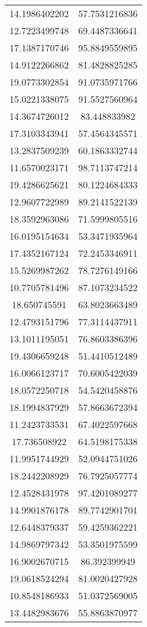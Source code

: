 \begin{table}
\begin{tabular}{cc}
14.1986402202 & 57.7531216836 \\
12.7223499748 & 69.4487336641 \\
17.1387170746 & 95.8849559895 \\
14.9122266862 & 81.4828825285 \\
19.0773302854 & 91.0735971766 \\
15.0221338075 & 91.5527560964 \\
14.3674726012 & 83.448833982 \\
17.3103343941 & 57.4564345571 \\
13.2837509239 & 60.1863332744 \\
11.6570023171 & 98.7113747214 \\
19.4286625621 & 80.1224684333 \\
12.9607722989 & 89.2141522139 \\
18.3592963086 & 71.5999805516 \\
16.0195154634 & 53.3471935964 \\
17.4352167124 & 72.2453346911 \\
15.5269987262 & 78.7276149166 \\
10.7705781496 & 87.1073234522 \\
18.650745591 & 63.8023663489 \\
12.4793151796 & 77.3114437911 \\
13.1011195051 & 76.8603386396 \\
19.4306659248 & 51.4410512489 \\
16.0066123717 & 70.6005422039 \\
18.0572250718 & 54.5420458876 \\
18.1994837929 & 57.8663672394 \\
11.2423733531 & 67.4022597668 \\
17.736508922 & 64.5198175338 \\
11.9951744929 & 52.0944751026 \\
18.2442208929 & 76.7925057774 \\
12.4528431978 & 97.4201089277 \\
14.9901876178 & 89.7742901701 \\
12.6448379337 & 59.4259362221 \\
14.9869797342 & 53.3501975599 \\
16.9002670715 & 86.392399949 \\
19.0618524294 & 81.0020427928 \\
10.8548186933 & 51.0372569005 \\
13.4482983676 & 55.8863870977 \\

\end{tabular}
\end{table}

